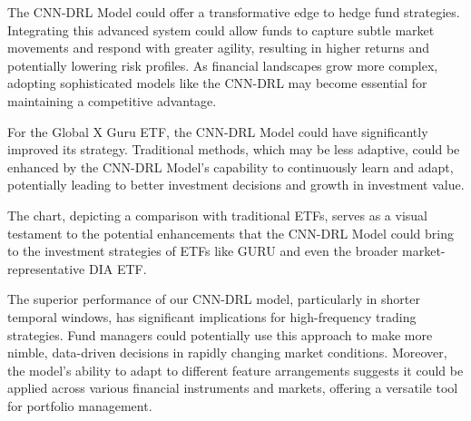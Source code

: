 The CNN-DRL Model could offer a transformative edge to hedge fund strategies. Integrating this advanced system could allow funds to capture subtle market movements and respond with greater agility, resulting in higher returns and potentially lowering risk profiles. As financial landscapes grow more complex, adopting sophisticated models like the CNN-DRL may become essential for maintaining a competitive advantage.

For the Global X Guru ETF, the CNN-DRL Model could have significantly improved its strategy. Traditional methods, which may be less adaptive, could be enhanced by the CNN-DRL Model's capability to continuously learn and adapt, potentially leading to better investment decisions and growth in investment value.

The chart, depicting a comparison with traditional ETFs, serves as a visual testament to the potential enhancements that the CNN-DRL Model could bring to the investment strategies of ETFs like GURU and even the broader market-representative DIA ETF.

The superior performance of our CNN-DRL model, particularly in shorter temporal windows, has significant implications for high-frequency trading strategies. Fund managers could potentially use this approach to make more nimble, data-driven decisions in rapidly changing market conditions. Moreover, the model's ability to adapt to different feature arrangements suggests it could be applied across various financial instruments and markets, offering a versatile tool for portfolio management.


